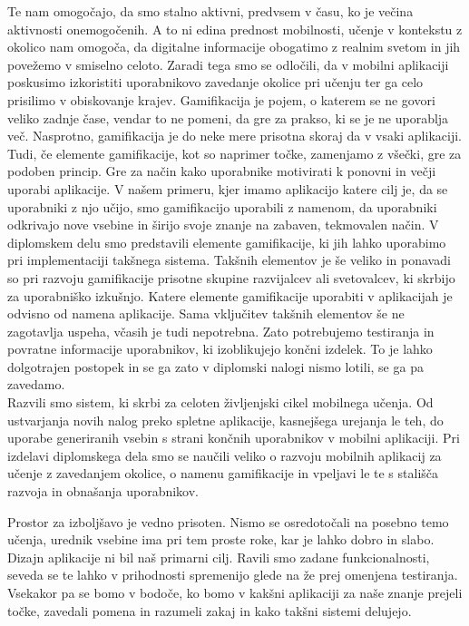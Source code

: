 \documentclass[a4paper, 12pt]{book}
\begin{document}
Te nam omogočajo, da smo stalno aktivni, predvsem v času, ko je večina aktivnosti onemogočenih. A to ni edina prednost mobilnosti, učenje v kontekstu z okolico nam omogoča, da digitalne informacije obogatimo z realnim svetom in jih povežemo v smiselno celoto. Zaradi tega smo se odločili, da v mobilni aplikaciji poskusimo izkoristiti uporabnikovo zavedanje okolice pri učenju ter ga celo prisilimo v obiskovanje krajev. Gamifikacija je pojem, o katerem se ne govori veliko zadnje čase, vendar to ne pomeni, da gre za prakso, ki se je ne uporablja več. Nasprotno, gamifikacija je do neke mere prisotna skoraj da v vsaki aplikaciji. Tudi, če elemente gamifikacije, kot so naprimer točke, zamenjamo z všečki, gre za podoben princip. Gre za način kako uporabnike motivirati k ponovni in večji uporabi aplikacije. V našem primeru, kjer imamo aplikacijo katere cilj je, da se uporabniki z njo učijo, smo gamifikacijo uporabili z namenom, da uporabniki odkrivajo nove vsebine in širijo svoje znanje na zabaven, tekmovalen način. V diplomskem delu smo predstavili elemente gamifikacije, ki jih lahko uporabimo pri implementaciji takšnega sistema. Takšnih elementov je še veliko in ponavadi so pri razvoju gamifikacije prisotne skupine razvijalcev ali svetovalcev, ki skrbijo za uporabniško izkušnjo. Katere elemente gamifikacije uporabiti v aplikacijah je odvisno od namena aplikacije. Sama vključitev takšnih elementov še ne zagotavlja uspeha, včasih je tudi nepotrebna. Zato potrebujemo testiranja in povratne informacije uporabnikov, ki izoblikujejo končni izdelek. To je lahko dolgotrajen postopek in se ga zato v diplomski nalogi nismo lotili, se ga pa zavedamo.\\Razvili smo sistem, ki skrbi za celoten življenjski cikel mobilnega učenja. Od ustvarjanja novih nalog preko spletne aplikacije, kasnejšega urejanja le teh, do uporabe generiranih vsebin s strani končnih uporabnikov v mobilni aplikaciji. Pri izdelavi diplomskega dela smo se naučili veliko o razvoju mobilnih aplikacij za učenje z zavedanjem okolice, o namenu gamifikacije in vpeljavi le te s stališča razvoja in obnašanja uporabnikov. 

Prostor za izboljšavo je vedno prisoten. Nismo se osredotočali na posebno temo učenja, urednik vsebine ima pri tem proste roke, kar je lahko dobro in slabo. Dizajn aplikacije ni bil naš primarni cilj. Ravili smo zadane funkcionalnosti, seveda se te lahko v prihodnosti spremenijo glede na že prej omenjena testiranja. Vsekakor pa se bomo v bodoče, ko bomo v kakšni aplikaciji za naše znanje prejeli točke, zavedali pomena in razumeli zakaj in kako takšni sistemi delujejo.

\end{document}
